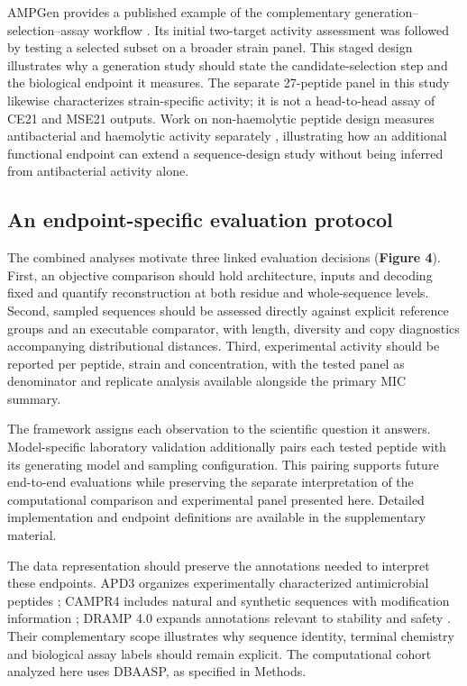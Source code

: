 \documentclass[unnumsec,webpdf,contemporary,large]{oup-authoring-template}
\begin{document}
AMPGen provides a published example of the complementary generation--selection--assay workflow \cite{ref9}. Its initial two-target activity assessment was followed by testing a selected subset on a broader strain panel. This staged design illustrates why a generation study should state the candidate-selection step and the biological endpoint it measures. The separate 27-peptide panel in this study likewise characterizes strain-specific activity; it is not a head-to-head assay of CE21 and MSE21 outputs. Work on non-haemolytic peptide design measures antibacterial and haemolytic activity separately \cite{ref24}, illustrating how an additional functional endpoint can extend a sequence-design study without being inferred from antibacterial activity alone.

\subsection{An endpoint-specific evaluation protocol}

The combined analyses motivate three linked evaluation decisions (\textbf{Figure 4}). First, an objective comparison should hold architecture, inputs and decoding fixed and quantify reconstruction at both residue and whole-sequence levels. Second, sampled sequences should be assessed directly against explicit reference groups and an executable comparator, with length, diversity and copy diagnostics accompanying distributional distances. Third, experimental activity should be reported per peptide, strain and concentration, with the tested panel as denominator and replicate analysis available alongside the primary MIC summary.

The framework assigns each observation to the scientific question it answers. Model-specific laboratory validation additionally pairs each tested peptide with its generating model and sampling configuration. This pairing supports future end-to-end evaluations while preserving the separate interpretation of the computational comparison and experimental panel presented here. Detailed implementation and endpoint definitions are available in the supplementary material.

The data representation should preserve the annotations needed to interpret these endpoints. APD3 organizes experimentally characterized antimicrobial peptides \cite{ref60}; CAMPR4 includes natural and synthetic sequences with modification information \cite{ref63}; DRAMP 4.0 expands annotations relevant to stability and safety \cite{ref61}. Their complementary scope illustrates why sequence identity, terminal chemistry and biological assay labels should remain explicit. The computational cohort analyzed here uses DBAASP, as specified in Methods.
\end{document}
